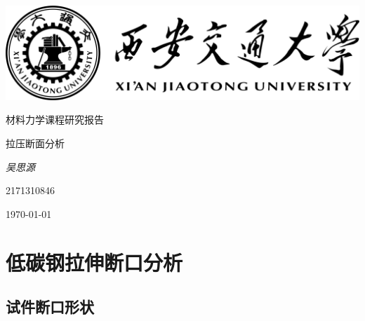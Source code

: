 \documentclass[12pt, a4paper]{ctexart}
\title{\thistitle}
\author{\thisauthor}
\newcommand{\thistitle}{拉压断面分析}
\newcommand{\thisauthor}{吴思源}
\begin{document}
\begin{titlepage}
	\centering
	\includegraphics[width=1.0\textwidth]{../templates/logo.png}\par
	\vspace{2cm}
	{\kaishu\LARGE 材料力学课程研究报告\par}
	\vspace{1.5cm}
	{\fontsize{36pt}{\baselineskip} \heiti \thistitle \par}
	\vspace{2cm}
	{\fangsong\Large\itshape \thisauthor\par}
	\vfill
	{2171310846}\par

	\vfill
	{\large \today\par}
\end{titlepage}
\section{低碳钢拉伸断口分析}
\subsection{试件断口形状}
\end{document}
